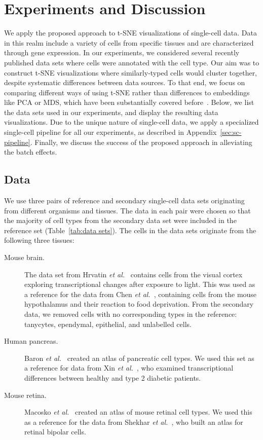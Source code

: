 \documentclass[runningheads]{llncs}
\newcommand{\etal}{\textit{et al.}}
\begin{document}
\section{Experiments and Discussion}

We apply the proposed approach to t-SNE visualizations of single-cell data. Data
in this realm include a variety of cells from specific tissues and are
characterized through gene expression.  In our experiments, we considered
several recently published data sets where cells were annotated with the cell
type. Our aim was to construct t-SNE visualizations where similarly-typed cells
would cluster together, despite systematic differences between data sources. To
that end, we focus on comparing different ways of using t-SNE rather than
differences to embeddings like PCA or MDS, which have been substantially covered
before~\cite{Maaten2008,Becht2019}. Below, we list the data sets used in our
experiments, and display the resulting data visualizations. Due to the unique
nature of single-cell data, we apply a specialized single-cell pipeline for all
our experiments, as described in Appendix~\ref{sec:sc-pipeline}. Finally, we
discuss the success of the proposed approach in alleviating the batch effects.


\subsection{Data}

We use three pairs of reference and secondary single-cell data sets originating
from different organisms and tissues. The data in each pair were chosen so that
the majority of cell types from the secondary data set were included in the
reference set (Table~\ref{tab:data sets}). The cells in the data sets originate
from the following three tissues:

\begin{description}
\item[Mouse brain.] The data set from Hrvatin \etal~\cite{Hrvatin2018} contains
cells from the visual cortex exploring transcriptional changes after exposure
to light. This was used as a reference for the data from Chen
\etal~\cite{Chen2017}, containing cells from the mouse hypothalamus and
their reaction to food deprivation. From the secondary data, we removed cells
with no corresponding types in the reference: tanycytes, ependymal,
epithelial, and unlabelled cells.

\item[Human pancreas.] Baron \etal~\cite{Baron2016} created
an atlas of pancreatic cell types. We used this set as a reference
for data from Xin \etal~\cite{Xin2016}, who examined transcriptional
differences between healthy and type 2 diabetic patients.

\item[Mouse retina.] Macosko \etal~\cite{Macosko2015} created
an atlas of mouse retinal cell types. We used this as a reference
for the data from Shekhar \etal~\cite{Shekhar2016}, who built an atlas for
retinal bipolar cells.
\end{description}
\end{document}
